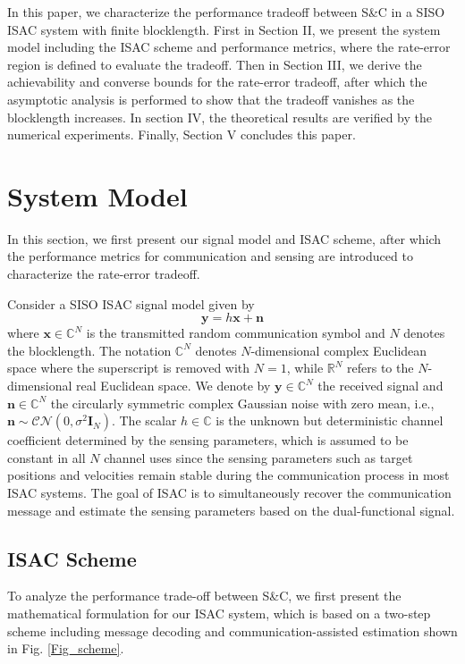 \documentclass[conference,a4paper]{IEEEtran}
\newcommand{\V}[1]{\bm{#1}} %
\begin{document}
In this paper, we characterize the performance tradeoff between S\&C in a SISO ISAC system with finite blocklength. First in Section II, we present the system model including the ISAC scheme and performance metrics, where the rate-error region is defined to evaluate the tradeoff. Then in Section III, we derive the achievability and converse bounds for the rate-error tradeoff, after which the asymptotic analysis is performed to show that the tradeoff vanishes as the blocklength increases. In section IV, the theoretical results are verified by the numerical experiments. Finally, Section V concludes this paper.



\section{System Model}
In this section, we first present our signal model and ISAC scheme, after which the performance metrics for communication and sensing are introduced to characterize the rate-error tradeoff.

Consider a SISO ISAC signal model given by
\begin{equation}
\label{Channel}
    \mathbf{y} = h\mathbf{x}+\mathbf{n}
\end{equation}
where $\mathbf{x}\in \mathbb{C}^N$ is the transmitted random communication symbol and $N$ denotes the blocklength. The notation $\mathbb{C}^N$ denotes $N$-dimensional complex Euclidean space where the superscript is removed with $N=1$, while $\mathbb{R}^N$ refers to the $N$-dimensional real Euclidean space. We denote by $\mathbf{y}\in \mathbb{C}^N$ the received signal and $\mathbf{n}\in \mathbb{C}^N$ the circularly symmetric complex Gaussian noise with zero mean, i.e., $\mathbf{n}\sim\mathcal{CN}(0,\sigma^2\V{I}_N)$. The scalar $h \in \mathbb{C}$ is the unknown but deterministic channel coefficient determined by the sensing parameters, which is assumed to be constant in all $N$ channel uses since the sensing parameters such as target positions and velocities remain stable during the communication process in most ISAC systems. The goal of ISAC is to simultaneously recover the communication message and estimate the sensing parameters based on the dual-functional signal. 
\subsection{ISAC Scheme} 
To analyze the performance trade-off between S\&C, we first present the mathematical formulation for our ISAC system, which is based on a two-step scheme including message decoding and communication-assisted estimation shown in Fig. \ref{Fig_scheme}.
\end{document}
